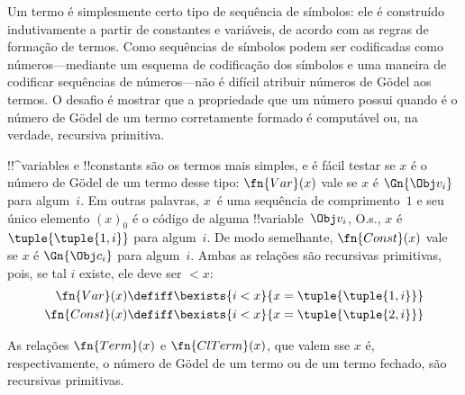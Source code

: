 \documentclass[../../../include/open-logic-section]{subfiles}
\begin{document}

\begin{explain}
Um termo é simplesmente certo tipo de sequência de símbolos: ele é
construído indutivamente a partir de constantes e variáveis, de acordo
com as regras de formação de termos. Como sequências de símbolos podem
ser codificadas como números---mediante um esquema de codificação dos
símbolos e uma maneira de codificar sequências de números---não é
difícil atribuir números de G\"odel aos termos. O desafio é mostrar que
a propriedade que um número possui quando é o número de G\"odel de um
termo corretamente formado é computável ou, na verdade, recursiva
primitiva.
\end{explain}

!!^{variable}s e !!{constant}s são os termos mais simples, e é fácil
testar se $x$ é o número de G\"odel de um termo desse tipo:
$\fn{Var}(x)$ vale se $x$ é $\Gn{\Obj v_i}$ para algum~$i$. Em outras
palavras, $x$~é uma sequência de comprimento~$1$ e seu único elemento
$(x)_0$ é o código de alguma !!{variable}~$\Obj v_i$, O.s.\@, $x$ é
$\tuple{\tuple{1, i}}$ para algum~$i$. De modo semelhante,
$\fn{Const}(x)$ vale se $x$ é $\Gn{\Obj c_i}$ para algum~$i$. Ambas as
relações são recursivas primitivas, pois, se tal $i$ existe, ele deve
ser $< x$:
\begin{align*}
  \fn{Var}(x) & \defiff \bexists{i<x}{x = \tuple{\tuple{1, i}}}\\
  \fn{Const}(x) & \defiff \bexists{i<x}{x = \tuple{\tuple{2, i}}}
\end{align*}

\begin{prop}
As relações $\fn{Term}(x)$ e $\fn{ClTerm}(x)$, que valem sse $x$ é,
respectivamente, o número de G\"odel de um termo ou de um termo fechado,
são recursivas primitivas.
\end{prop}
\end{document}
